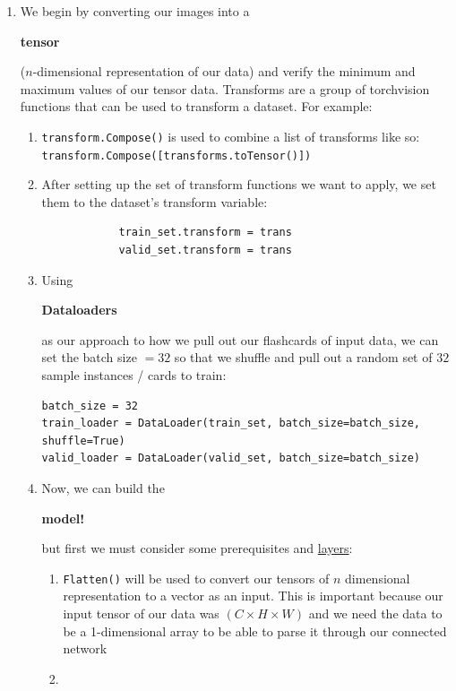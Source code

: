 \documentclass{article}
\begin{document}
\begin{enumerate}
    \item We begin by converting our images into a \begin{large}\textbf{tensor}\end{large} ($n$-dimensional representation of our data) and verify the minimum and maximum values of our tensor data. Transforms are a group of torchvision functions that can be used to transform a dataset. For example: \begin{enumerate}
        \item \verb|transform.Compose()| is used to combine a list of transforms like so:\\
        \verb|transform.Compose([transforms.toTensor()])|
        \item After setting up the set of transform functions we want to apply, we set them to the dataset's transform variable: \begin{verbatim}
            train_set.transform = trans
            valid_set.transform = trans
        \end{verbatim}
        \item Using \begin{large}\textbf{Dataloaders}\end{large} as our approach to how we pull out our flashcards of input data, we can set the batch size $= 32$ so that we shuffle and pull out a random set of $32$ sample instances / cards to train: \begin{verbatim}
batch_size = 32
train_loader = DataLoader(train_set, batch_size=batch_size, shuffle=True)
valid_loader = DataLoader(valid_set, batch_size=batch_size)
        \end{verbatim}
        \item Now, we can build the \begin{large}\textbf{model!}\end{large} but first we must consider some prerequisites and \href{https://medium.com/@sarita_68521/basic-understanding-of-neural-network-structure-eecc8f149a23}{layers}: 
            \begin{enumerate}
                \item \verb|Flatten()| will be used to convert our tensors of $n$ dimensional representation to a vector as an input. This is important because our input tensor of our data was $(C \times H \times W)$ and we need the data to be a 1-dimensional array to be able to parse it through our connected network
                \item 
            \end{enumerate}
    \end{enumerate}
\end{enumerate}
\end{document}
